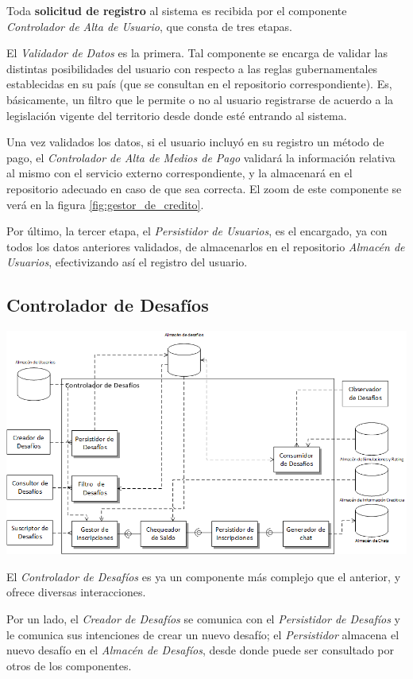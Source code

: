 Toda \textbf{solicitud de registro} al sistema es recibida por el componente \emph{Controlador de Alta de Usuario}, que consta de tres etapas. 

El \emph{Validador de Datos} es la primera. Tal componente se encarga de validar las distintas posibilidades del usuario con respecto a las reglas gubernamentales establecidas en su país (que se consultan en el repositorio correspondiente). Es, básicamente, un filtro que le permite o no al usuario registrarse de acuerdo a la legislación vigente del territorio desde donde esté entrando al sistema.

Una vez validados los datos, si el usuario incluyó en su registro un método de pago, el \emph{Controlador de Alta de Medios de Pago} validará la información relativa al mismo con el servicio externo correspondiente, y la almacenará en el repositorio adecuado en caso de que sea correcta. El zoom de este componente se verá en la figura \ref{fig:gestor_de_credito}.

Por último, la tercer etapa, el \emph{Persistidor de Usuarios}, es el encargado, ya con todos los datos anteriores validados, de almacenarlos en el repositorio \emph{Almacén de Usuarios}, efectivizando así el registro del usuario.

\subsection{Controlador de Desafíos}
\includegraphics[scale=0.63]{diagramas/controlador_de_desafios}
\label{fig:controlador_de_desafios}

El \emph{Controlador de Desafíos} es ya un componente más complejo que el anterior, y ofrece diversas interacciones.

Por un lado, el \emph{Creador de Desafíos} se comunica con el \emph{Persistidor de Desafíos} y le comunica sus intenciones de crear un nuevo desafío; el \emph{Persistidor} almacena el nuevo desafío en el \emph{Almacén de Desafíos}, desde donde puede ser consultado por otros de los componentes.

